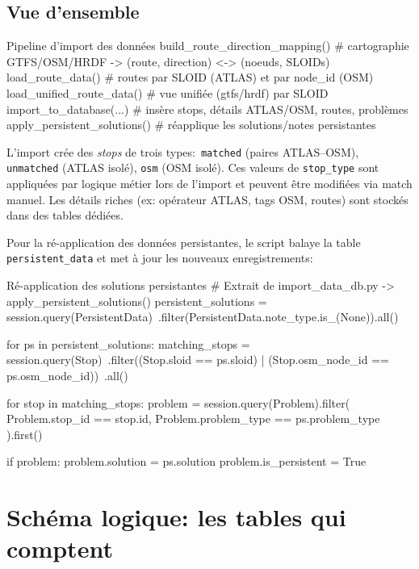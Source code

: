 \subsection*{Vue d'ensemble}
\begin{codebox}[language=Python]{Pipeline d'import des données}
build_route_direction_mapping()  # cartographie GTFS/OSM/HRDF -> (route, direction) <-> (noeuds, SLOIDs)
load_route_data()                # routes par SLOID (ATLAS) et par node_id (OSM)
load_unified_route_data()        # vue unifiée (gtfs/hrdf) par SLOID
import_to_database(...)          # insère stops, détails ATLAS/OSM, routes, problèmes
apply_persistent_solutions()     # réapplique les solutions/notes persistantes
\end{codebox}

L'import crée des \textit{stops} de trois types:\ \texttt{matched} (paires ATLAS–OSM), \texttt{unmatched} (ATLAS isolé), \texttt{osm} (OSM isolé). Ces valeurs de \texttt{stop\_type} sont appliquées par logique métier lors de l'import et peuvent être modifiées via match manuel. Les détails riches (ex: opérateur ATLAS, tags OSM, routes) sont stockés dans des tables dédiées.

Pour la ré-application des données persistantes, le script balaye la table \texttt{persistent\_data} et met à jour les nouveaux enregistrements:

\begin{codebox}[language=Python]{Ré-application des solutions persistantes}
# Extrait de import_data_db.py -> apply_persistent_solutions()
persistent_solutions = session.query(PersistentData)\
    .filter(PersistentData.note_type.is_(None)).all()

for ps in persistent_solutions:
    matching_stops = session.query(Stop)\
        .filter((Stop.sloid == ps.sloid) | (Stop.osm_node_id == ps.osm_node_id))\
        .all()
    
    for stop in matching_stops:
        problem = session.query(Problem).filter(
            Problem.stop_id == stop.id,
            Problem.problem_type == ps.problem_type
        ).first()
        
        if problem:
            problem.solution = ps.solution
            problem.is_persistent = True
\end{codebox}

\section{Schéma logique: les tables qui comptent}

